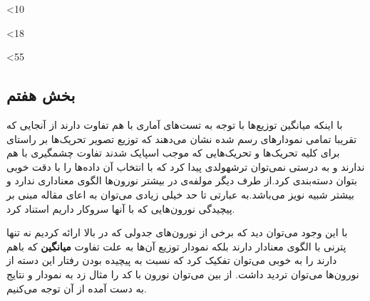 \documentclass[12pt,onecolumn,a4paper,fleqn]{article}
\begin{document}
		 \begin{figure}[ht]
		 	\centering
			\hfill
		 \end{figure}
		 
		 \addtocounter{int}{1}\ifnum\value{int}<10
		 \repeat
		 
		 
		 \loop
		 
		 \begin{figure}[h]
		 	\centering
		 	\hfill
		 \end{figure}
		 
		 
		 \addtocounter{int}{1}\ifnum\value{int}<18
		 \repeat
		 
		 \clearpage
		 
		 \loop
		 
		 
		 \begin{figure}[h]
		 	\centering
		 	\hfill
		 \end{figure}	 	     

		 
		 \addtocounter{int}{1}\ifnum\value{int}<55
		 \repeat 
		 
		 
		 \clearpage
		 
		\subsection{بخش هفتم}
	با اینکه میانگین توزیع‌ها با توجه به تست‌های آماری با هم تفاوت دارند از آنجایی که تقریبا تمامی نمودار‌های رسم شده نشان می‌دهند که توزیع تصویر تحریک‌ها بر راستای  برای کلیه تحریک‌ها و تحریک‌هایی که موجب اسپایک شدند تفاوت چشمگیری با هم ندارند و به درستی نمی‌توان ترشهولدی پیدا کرد که با انتخاب آن داده‌ها را با دقت خوبی بتوان دسته‌بندی کرد.از طرف دیگر مولفه‌ی  در بیشتر نورون‌ها الگوی‌ معناداری ندارد و بیشتر شبیه نویز‌ می‌باشد.به عبارتی تا حد خیلی زیادی می‌توان به اعای مقاله مبنی بر پیچیدگی نور‌ون‌هایی که با آنها سروکار داریم استناد کرد.
	
	با این وجود می‌توان دید که برخی از نورون‌های جدولی که در بالا ارائه کردیم نه تنها پترنی با الگوی معنادار دارند بلکه نمودار توزیع آن‌ها به علت تفاوت \textbf{میانگین} که باهم دارند را به خوبی می‌توان تفکیک کرد که نسبت به پیچیده بودن رفتار این دسته از نورون‌ها می‌توان تردید داشت. از بین می‌توان نورون با کد  را مثال زد به نمودار و نتایج به دست آمده از آن توجه می‌کنیم.
		
\end{document}
